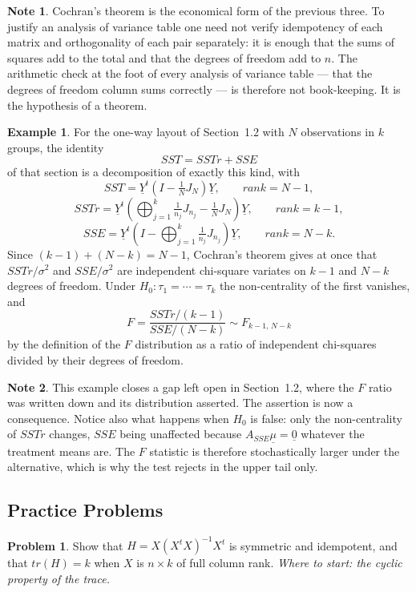 \documentclass[11pt,a4paper]{article}
\theoremstyle{definition}
\newtheorem{exa}[thm]{Example}
\newtheorem*{note}{Note}
\newtheorem{problemx}{Problem}[section]
\newenvironment{problem}{\begin{problemx}}{\end{problemx}}
\begin{document}
\begin{note}
Cochran's theorem is the economical form of the previous three. To justify an
analysis of variance table one need not verify idempotency of each matrix and
orthogonality of each pair separately: it is enough that the sums of squares
add to the total and that the degrees of freedom add to $n$. The arithmetic
check at the foot of every analysis of variance table --- that the degrees of
freedom column sums correctly --- is therefore not book-keeping. It is the
hypothesis of a theorem.
\end{note}

\begin{exa}
\label{res:exa:cochranowa}
For the one-way layout of Section~1.2 with $N$ observations in $k$ groups, the
identity
$$SST = SSTr + SSE$$
of that section is a decomposition of exactly this kind, with
$$SST=\underline{Y}^t\left(I-\tfrac{1}{N}J_N\right)\underline{Y},\qquad
rank=N-1,$$
$$SSTr=\underline{Y}^t\left(\bigoplus_{j=1}^{k}\tfrac{1}{n_j}J_{n_j}
-\tfrac{1}{N}J_N\right)\underline{Y},\qquad rank=k-1,$$
$$SSE=\underline{Y}^t\left(I-\bigoplus_{j=1}^{k}\tfrac{1}{n_j}J_{n_j}\right)
\underline{Y},\qquad rank=N-k.$$
Since $(k-1)+(N-k)=N-1$, Cochran's theorem gives at once that
$SSTr/\sigma^2$ and $SSE/\sigma^2$ are independent chi-square variates on
$k-1$ and $N-k$ degrees of freedom. Under
$H_0:\tau_1=\cdots=\tau_k$ the non-centrality of the first vanishes, and
$$F=\frac{SSTr/(k-1)}{SSE/(N-k)}\sim F_{k-1,\,N-k}$$
by the definition of the $F$ distribution as a ratio of independent
chi-squares divided by their degrees of freedom.
\end{exa}

\begin{note}
This example closes a gap left open in Section~1.2, where the $F$ ratio was
written down and its distribution asserted. The assertion is now a
consequence. Notice also what happens when $H_0$ is false: only the
non-centrality of $SSTr$ changes, $SSE$ being unaffected because
$A_{SSE}\underline{\mu}=\underline{0}$ whatever the treatment means are. The
$F$ statistic is therefore stochastically larger under the alternative, which
is why the test rejects in the upper tail only.
\end{note}

\subsection{Practice Problems}

\begin{problem}
Show that $H=X\left(X^tX\right)^{-1}X^t$ is symmetric and idempotent, and that
$tr(H)=k$ when $X$ is $n\times k$ of full column rank.
\emph{Where to start: the cyclic property of the trace.}
\end{problem}
\end{document}
